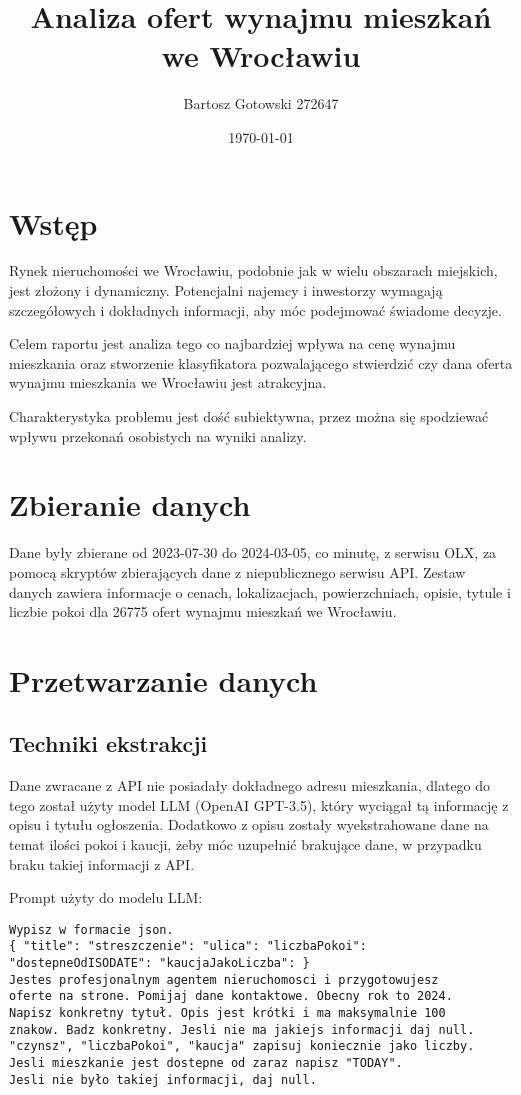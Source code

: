 \documentclass[12pt]{article}
\title{Analiza ofert wynajmu mieszkań we Wrocławiu}
\author{Bartosz Gotowski 272647}
\date{\today}
\begin{document}
\maketitle

\tableofcontents

\pagebreak

\section{Wstęp}
Rynek nieruchomości we Wrocławiu, podobnie jak w wielu obszarach miejskich, jest złożony i dynamiczny. Potencjalni najemcy i inwestorzy wymagają szczegółowych i dokładnych informacji, aby móc podejmować świadome decyzje. 

Celem raportu jest analiza tego co najbardziej wpływa na cenę wynajmu mieszkania oraz stworzenie klasyfikatora pozwalającego stwierdzić czy dana oferta wynajmu mieszkania we Wrocławiu jest atrakcyjna. 

Charakterystyka problemu jest dość subiektywna, przez można się spodziewać wpływu przekonań osobistych na wyniki analizy. 

\section{Zbieranie danych}
Dane były zbierane od 2023-07-30 do 2024-03-05, co minutę, z serwisu OLX, za pomocą skryptów zbierających dane z niepublicznego serwisu API. Zestaw danych zawiera informacje o cenach, lokalizacjach, powierzchniach, opisie, tytule i liczbie pokoi dla 26775 ofert wynajmu mieszkań we Wrocławiu.


\section{Przetwarzanie danych}
\subsection{Techniki ekstrakcji}
Dane zwracane z API nie posiadały dokładnego adresu mieszkania, dlatego do tego został użyty model LLM (OpenAI GPT-3.5), który wyciągał tą informację z opisu i tytułu ogłoszenia. Dodatkowo z opisu zostały wyekstrahowane dane na temat ilości pokoi i kaucji, żeby móc uzupełnić brakujące dane, w przypadku braku takiej informacji z API.

Prompt użyty do modelu LLM:
\begin{verbatim}
Wypisz w formacie json.
{ "title": "streszczenie": "ulica": "liczbaPokoi": 
"dostepneOdISODATE": "kaucjaJakoLiczba": }
Jestes profesjonalnym agentem nieruchomosci i przygotowujesz
oferte na strone. Pomijaj dane kontaktowe. Obecny rok to 2024.
Napisz konkretny tytuł. Opis jest krótki i ma maksymalnie 100
znakow. Badz konkretny. Jesli nie ma jakiejs informacji daj null.
"czynsz", "liczbaPokoi", "kaucja" zapisuj koniecznie jako liczby. 
Jesli mieszkanie jest dostepne od zaraz napisz "TODAY".
Jesli nie było takiej informacji, daj null.
\end{verbatim}
\end{document}
